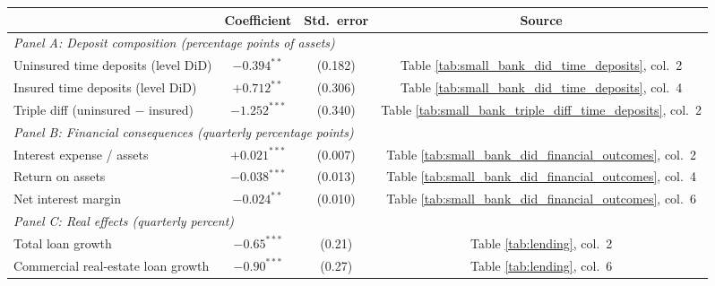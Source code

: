 \begin{tabular}{lccc}
\toprule
 & Coefficient & Std.\ error & Source \\
\midrule
\multicolumn{4}{l}{\textit{Panel A: Deposit composition (percentage points of assets)}} \\
\quad Uninsured time deposits (level DiD) & $-0.394^{**}$ & (0.182) & Table \ref{tab:small_bank_did_time_deposits}, col.\ 2 \\
\quad Insured time deposits (level DiD)    & $+0.712^{**}$ & (0.306) & Table \ref{tab:small_bank_did_time_deposits}, col.\ 4 \\
\quad Triple diff (uninsured $-$ insured)  & $-1.252^{***}$ & (0.340) & Table \ref{tab:small_bank_triple_diff_time_deposits}, col.\ 2 \\
\midrule
\multicolumn{4}{l}{\textit{Panel B: Financial consequences (quarterly percentage points)}} \\
\quad Interest expense / assets            & $+0.021^{***}$ & (0.007) & Table \ref{tab:small_bank_did_financial_outcomes}, col.\ 2 \\
\quad Return on assets                     & $-0.038^{***}$ & (0.013) & Table \ref{tab:small_bank_did_financial_outcomes}, col.\ 4 \\
\quad Net interest margin                  & $-0.024^{**}$  & (0.010) & Table \ref{tab:small_bank_did_financial_outcomes}, col.\ 6 \\
\midrule
\multicolumn{4}{l}{\textit{Panel C: Real effects (quarterly percent)}} \\
\quad Total loan growth                    & $-0.65^{***}$ & (0.21) & Table \ref{tab:lending}, col.\ 2 \\
\quad Commercial real-estate loan growth   & $-0.90^{***}$ & (0.27) & Table \ref{tab:lending}, col.\ 6 \\
\bottomrule
\end{tabular}
